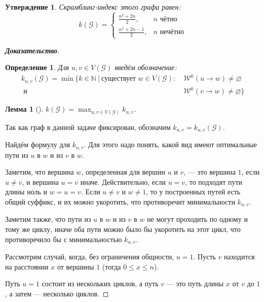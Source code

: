 \documentclass[12pt]{article}
\newtheorem{definition}[theorem]{Определение}
\newtheorem{proposition}[theorem]{Утверждение}
\newtheorem{lemma}[theorem]{Лемма}
\begin{document}
\begin{proposition}
Скрамблинг-индекс этого графа равен: \begin{equation*}
k(\mathcal{G}) = \begin{cases}
        \frac{n^2 + 2n}{2},     & n \text{ чётно} \\
        \frac{n^2 + 2n - 1}{2}, & n \text{ нечётно}
    \end{cases}
\end{equation*}
\end{proposition}
\begin{proof}[\textbf{Доказательство}]
\begin{definition}
Для $u, v \in V(\mathcal{G})$ введём обозначение:\begin{align*}
k_{u,v}(\mathcal{G}) = \min \{ k \in \mathbb{N} \ | \ \text{существует } w \in V(\mathcal{G}) :\  &\mathcal{W}^k(u \rightarrow w) \neq \varnothing \\
\text{ и } &\mathcal{W}^k(v \rightarrow w) \neq \varnothing\}
\end{align*}
\end{definition}
\begin{lemma}[\cite{scramblingIndex}]
\label{k_uvLemma}
$k(\mathcal{G}) = \max_{u, v \in V(\mathcal{G})} k_{u,v}$.
\end{lemma}

Так как граф в данной задаче фиксирован, обозначим $k_{u,v} = k_{u,v}(\mathcal{G})$.

Найдём формулу для $k_{u,v}$. Для этого надо понять, какой вид имеют оптимальные пути из $u$ в $w$ и из $v$ в $w$.

Заметим, что вершина $w$, определенная для вершин $u$ и $v$, --- это вершина $1$, если $u \neq v$, и вершина $u = v$ иначе. Действительно, если $u = v$, то подходят пути длины ноль и $w = u = v$. Если $u \neq v$ и $w \neq 1$, то у построенных путей есть общий суффикс, и их можно укоротить, что противоречит минимальности $k_{u,v}$.

Заметим также, что пути из $u$ в $w$ и из $v$ в $w$ не могут проходить по одному и тому же циклу, иначе оба пути можно было бы укоротить на этот цикл, что противоречило бы с минимальностью $k_{u, v}$.

Рассмотрим случай, когда, без ограничения общности, $u = 1$. Пусть $v$ находится на расстоянии $x$ от вершины $1$ (тогда $0 \le x \le n$).

Путь $u = 1$ состоит из нескольких циклов, а путь $v$ --- это путь длины $x$ от $v$ до $1$, а затем --- несколько циклов.


\end{proof}
\end{document}
